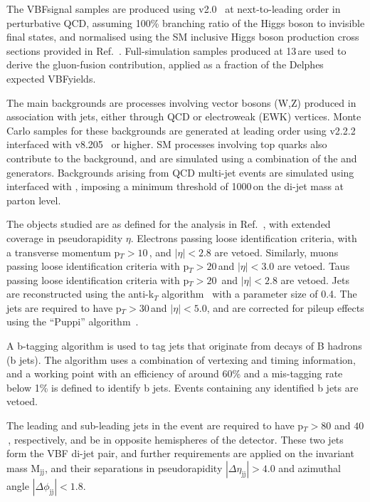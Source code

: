 \documentclass[../report.tex]{subfiles}
\begin{document}
The VBF\PH signal samples are produced using \POWHEG
v2.0~\cite{Alioli:2010xd,Nason:2009ai} at next-to-leading order
in perturbative QCD, assuming 100\% branching ratio \BHinv of the Higgs boson
to invisible final states, and normalised using the SM inclusive Higgs
boson production cross sections provided in Ref.~\cite{deFlorian:2016spz}.  Full-simulation samples produced at 13\,\UTeV are used to derive the gluon-fusion contribution, applied as a fraction of the Delphes expected VBF\PH yields.

The main backgrounds are processes involving vector bosons (W,Z)
produced in association with jets, either through QCD or electroweak
(EWK) vertices.  Monte Carlo samples for these backgrounds are
generated at leading order using \MGvATNLO v2.2.2~\cite{Alwall:2014hca} interfaced with \PYTHIA v8.205~\cite{Sjostrand:2014zea} or higher. SM processes involving top quarks also contribute to the
background, and are simulated using a combination of the \POWHEG and \MGvATNLO generators. Backgrounds arising from QCD multi-jet events are simulated using \MGvATNLO interfaced with \PYTHIA, imposing a minimum threshold of 1000\,\UGeV on the di-jet mass at parton level.


The objects studied are as defined for the analysis in Ref.~\cite{Sirunyan:2018owy}, with extended coverage in pseudorapidity $\eta$. Electrons passing loose
identification criteria, with a transverse momentum p$_T>10$\,\UGeV, and $|\eta|<2.8$ are vetoed. Similarly, muons passing loose
identification criteria with p$_T>20$\,\UGeV and $|\eta|<3.0$ are
vetoed. Taus passing loose identification criteria with p$_T>20$\,\UGeV
and $|\eta|<2.8$ are vetoed. Jets are reconstructed using the
anti-k$_T$ algorithm~\cite{Cacciari:2008gp,Cacciari:2011ma} with a parameter size of
0.4.  The jets are required to have p$_T>30$\,\UGeV and $|\eta|<5.0$,
and are corrected for pileup effects using the ``Puppi''
algorithm~\cite{Bertolini:2014bba}.

 A b-tagging algorithm is used to tag jets that originate from decays
of B hadrons (b jets).  The algorithm uses a combination of vertexing
and timing information, and a working point with an efficiency of
around 60\% and a mis-tagging rate below 1\% is defined to identify b
jets.  Events containing any identified b jets are vetoed.

The leading and sub-leading jets in the event are required to have
p$_{T}>80$ and $40$\,\UGeV, respectively, and be in opposite hemispheres of
the detector. These two jets form the VBF di-jet pair, and further
requirements are applied on the invariant mass M$_{\text{jj}}$, and
their separations in pseudorapidity $|\Delta\eta_{\text{jj}}|>4.0$ and
azimuthal angle $|\Delta\phi_{\text{jj}}|<1.8$.
\end{document}
